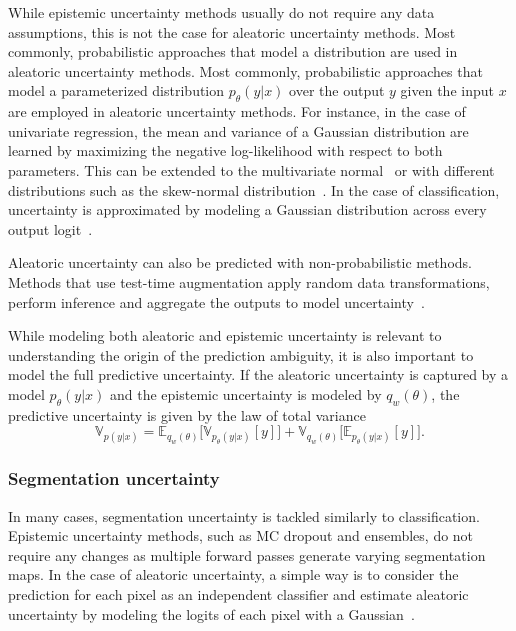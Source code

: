 While epistemic uncertainty methods usually do not require any data assumptions, this is not the case for aleatoric uncertainty methods. 
Most commonly, probabilistic approaches that model a distribution are used in aleatoric uncertainty methods. 
Most commonly, probabilistic approaches that model a parameterized distribution $p_\theta(y|x)$ over the output $y$ given the input $x$ are employed in aleatoric uncertainty methods. For instance, in the case of univariate regression, the mean and variance of a Gaussian distribution are learned by maximizing the negative log-likelihood with respect to both parameters. This can be extended to the multivariate normal~\cite{multivariate_uncertainty} or with different distributions such as the skew-normal distribution~\cite{miccai2023_contouring}. In the case of classification, uncertainty is approximated by modeling a Gaussian distribution across every output logit~\cite{bayesianCV}.



Aleatoric uncertainty can also be predicted with non-probabilistic methods. Methods that use test-time augmentation apply random data transformations, perform inference and aggregate the outputs to model uncertainty~\cite{ayhan2018_tta}. 


While modeling both aleatoric and epistemic uncertainty is relevant to understanding the origin of the prediction ambiguity, it is also important to model the full predictive uncertainty. If the aleatoric uncertainty is captured by a model $p_\theta(y|x)$ and the epistemic uncertainty is modeled by $q_w(\theta)$, the predictive uncertainty is given by the law of total variance~\cite{bayesianCV}
%
\begin{equation}
    \mathbb{V}_{p(y|x)} = \mathbb{E}_{q_w(\theta)}\Big[\mathbb{V}_{p_\theta(y|x)}[y]\Big] + \mathbb{V}_{q_w(\theta)}\Big[\mathbb{E}_{p_\theta(y|x)}[y]\Big].
\end{equation}
%
\subsubsection{Segmentation uncertainty}

In many cases, segmentation uncertainty is tackled similarly to classification. Epistemic uncertainty methods, such as MC dropout and ensembles, do not require any changes as multiple forward passes generate varying segmentation maps. In the case of aleatoric uncertainty, a simple way is to consider the prediction for each pixel as an independent classifier and estimate aleatoric uncertainty by modeling the logits of each pixel with a Gaussian~\cite{bayesianCV}.


